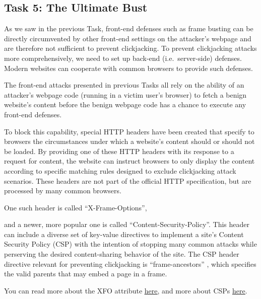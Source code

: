 
\subsection{Task 5: The Ultimate Bust}
As we saw in the previous Task, front-end defenses such as frame busting
can be directly circumvented by other front-end settings on the
attacker's webpage and are therefore not sufficient to prevent
clickjacking. To prevent clickjacking attacks more comprehensively, we
need to set up back-end (i.e.\ server-side) defenses.  Modern websites
can cooperate with common browsers to provide such defenses.

The front-end attacks presented in previous Tasks all rely on the
ability of an attacker's webpage code (running in a victim user's
browser) to fetch a benign website's content before the benign webpage
code has a chance to execute any front-end defenses. 

To block this capability, special HTTP headers have
been created that specify to browsers the 
circumstances under which a website's content should or should not be loaded.
By providing one of these HTTP headers with its response to a
request for content, the website can instruct
browsers to only display the content according to specific matching
rules designed to exclude clickjacking attack scenarios.
These headers are not part of the official HTTP specification,
but are processed by many common browsers.

One such header is called ``X-Frame-Options'',




and a newer, more popular one is called ``Content-Security-Policy''. 
This header can
include a diverse set of key-value directives to implement a site's Content Security
Policy (CSP) with the intention of stopping many common attacks while
perserving the desired content-sharing behavior of the site.  The CSP header
directive relevant for preventing clickjacking is ``frame-ancestors'' ,
which specifies the valid parents that may embed a page in a frame.

You can read more about the XFO attribute
\underline{\href{https://developer.mozilla.org/en-US/docs/Web/HTTP/Headers/X-Frame-Options}{here}},
and more about CSPs
\underline{\href{https://developer.mozilla.org/en-US/docs/Web/HTTP/CSP}{here}}.

